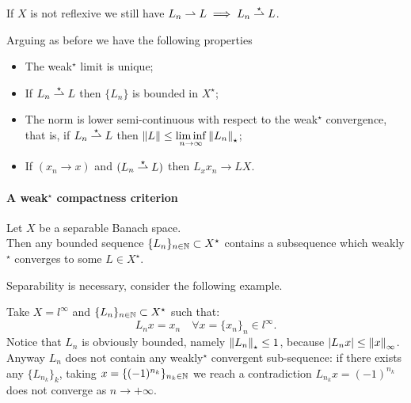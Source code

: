 If $X$ is not reflexive we still have $L_n \rightharpoonup L \implies L_n \overset{\star}{\rightharpoonup} L$.


Arguing as before we have the following properties
\begin{prop}
	\Fixvmode
	\begin{itemize}
		\item The weak$^\star$ limit is unique;
		\item If $L_n \overset{\star}{\rightharpoonup} L$ then $\{L_n\}$ is bounded in $X^\star$;
		\item The norm is lower semi-continuous with respect to the weak$^\star$ convergence, that is, if $L_n \overset{\star}{\rightharpoonup} L$ then $\left\lVert L\right\rVert\leq \liminf\limits_{n \to \infty}\left\lVert L_n\right\rVert_\star$;
		\item If $(x_n \to x)$ and $(L_n \overset{\star}{\rightharpoonup} L)$ then $L_x x_n \to L X$.
	\end{itemize}
\end{prop}

\paragraph{A weak$^\star$ compactness criterion}

\begin{theo} \label{theo-banach-alaoglu}
	Let $X$ be a separable Banach space. \\
	Then any bounded sequence $\{L_n\}_{n \in \mathbb N} \subset X^\star$ contains a subsequence which weakly$^\star$ converges to some $L\in X^\star$.
\end{theo}

Separability is necessary, consider the following example.
\begin{exam}
	Take $X = l^\infty$ and $\{L_n\}_{n\in\mathbb N} \subset X^\star$ such that:
	$$L_n x = x_n \quad \forall x = \{x_n\}_n \in l^\infty.$$
	Notice that $L_n$ is obviously bounded, namely $\left\lVert L_n\right\rVert_\star \le 1$, because $\left\lvert L_n x\right\rvert \le \left\lVert x\right\rVert_\infty$. \\
	Anyway $L_n$ does not contain any weakly$^\star$ convergent sub-sequence: if there exists any $\{L_{n_k}\}_k$, taking $x = \{(-1)^{n_k}\}_{n_k \in \mathbb N}$ we reach a contradiction $L_{n_k} x = (-1)^{n_k}$ does not converge as $n \to +\infty$.
\end{exam}


